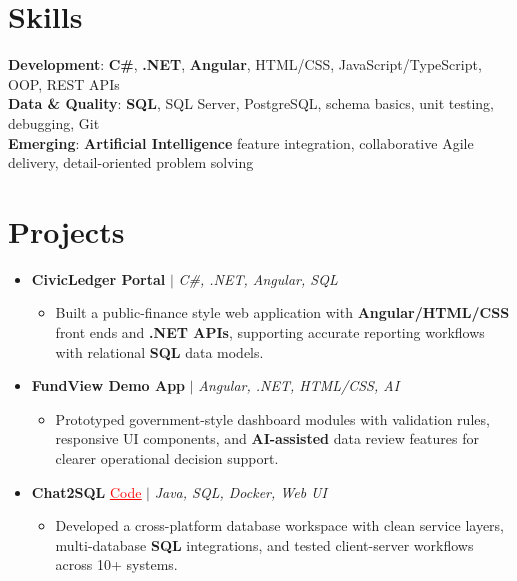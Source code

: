 \documentclass[letterpaper,10pt]{article}
\newcommand{\resumeItem}[1]{\item\small{{#1 \vspace{-2pt}}}}
\newcommand{\resumeProjectHeading}[1]{\item \small #1 \vspace{-2pt}}
\newcommand{\resumeSubHeadingListStart}{\begin{itemize}[leftmargin=0.0in, label={}]}
\newcommand{\resumeSubHeadingListEnd}{\end{itemize}}
\newcommand{\resumeProjItemListStart}{\begin{itemize}[leftmargin=0.15in,label=\textbullet,itemsep=0pt,topsep=0pt,parsep=0pt,partopsep=0pt]}
\newcommand{\resumeProjItemListEnd}{\end{itemize}\vspace{-4pt}}
\begin{document}
\section{Skills}
\begin{itemize}[leftmargin=0.15in, label={}]
\small{\item{
\textbf{Development}: \textbf{C\#}, \textbf{.NET}, \textbf{Angular}, HTML/CSS, JavaScript/TypeScript, OOP, REST APIs \\
\textbf{Data \& Quality}: \textbf{SQL}, SQL Server, PostgreSQL, schema basics, unit testing, debugging, Git \\
\textbf{Emerging}: \textbf{Artificial Intelligence} feature integration, collaborative Agile delivery, detail-oriented problem solving
}}
\end{itemize}
\vspace{-16pt}
\section{Projects}
\resumeSubHeadingListStart
\vspace{-2pt}
\resumeProjectHeading{\textbf{CivicLedger Portal} $|$ \emph{C\#, .NET, Angular, SQL}}
\resumeProjItemListStart
\resumeItem{Built a public-finance style web application with \textbf{Angular/HTML/CSS} front ends and \textbf{.NET APIs}, supporting accurate reporting workflows with relational \textbf{SQL} data models.}
\resumeProjItemListEnd
\vspace{3pt}
\resumeProjectHeading{\textbf{FundView Demo App} $|$ \emph{Angular, .NET, HTML/CSS, AI}}
\resumeProjItemListStart
\resumeItem{Prototyped government-style dashboard modules with validation rules, responsive UI components, and \textbf{AI-assisted} data review features for clearer operational decision support.}
\resumeProjItemListEnd
\vspace{3pt}
\resumeProjectHeading{\textbf{Chat2SQL} {\href{https://github.com/SAHAJ-BHADJA/Chat2SQL}{\textcolor{red}{\underline{Code}}}} $|$ \emph{Java, SQL, Docker, Web UI}}
\resumeProjItemListStart
\resumeItem{Developed a cross-platform database workspace with clean service layers, multi-database \textbf{SQL} integrations, and tested client-server workflows across 10+ systems.}
\resumeProjItemListEnd
\resumeSubHeadingListEnd
\end{document}
